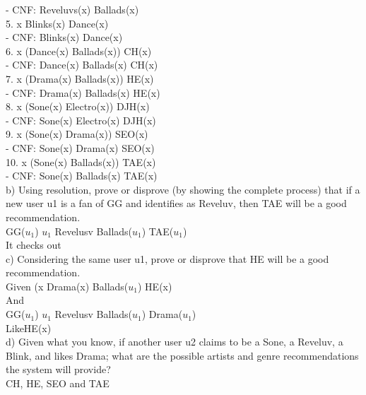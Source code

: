 \documentclass{article}
\begin{document}
\: \: \: \: - CNF: \neg Reveluvs(x) \wedge Ballads(x)\\

5. \forall x \: Blinks(x) \Rightarrow Dance(x)\\

\: \: \: \: - CNF: \neg Blinks(x) \vee Dance(x)\\

6. \forall x \: (Dance(x) \wedge Ballads(x)) \Rightarrow CH(x)\\

\: \: \: \: - CNF: \neg Dance(x) \vee \neg Ballads(x) \vee CH(x)\\

7. \forall x \: (Drama(x) \wedge Ballads(x)) \Rightarrow HE(x)\\

\: \: \: \: - CNF: \neg Drama(x) \vee \neg Ballads(x) \vee HE(x)\\

8. \forall x \: (Sone(x) \wedge Electro(x)) \Rightarrow DJH(x)\\

\: \: \: \: - CNF: \neg Sone(x) \vee \neg Electro(x) \vee DJH(x)\\

9. \forall x \: (Sone(x) \wedge Drama(x)) \Rightarrow SEO(x)\\

\: \: \: \: - CNF: \neg Sone(x) \vee \neg Drama(x) \vee SEO(x)\\

10. \forall x \: (Sone(x) \wedge Ballads(x)) \Rightarrow TAE(x)\\

\: \: \: \: - CNF: \neg Sone(x) \vee \neg Ballads(x) \vee TAE(x)\\

b) Using resolution, prove or disprove (by showing the complete process) that if a new user u1 is a fan of GG and identifies as Reveluv, then TAE will be a good recommendation.\\

GG($u_1$) \Leftrightarrow $u_1$ \in Revelusv \Rightarrow Ballads($u_1$) \Rightarrow TAE($u_1$)\\

It checks out\\

c) Considering the same user u1, prove or disprove that HE will be a good recommendation.\\

Given (x \in Drama(x) \wedge Ballads($u_1$) \Rightarrow HE(x)\\
And\\
GG($u_1$) \Leftrightarrow $u_1$ \in Revelusv \Rightarrow Ballads($u_1$) \wedge \neg Drama($u_1$)\\


\neg LikeHE(x)\\

d) Given what you know, if another user u2 claims to be a Sone, a Reveluv, a Blink, and likes Drama;
what are the possible artists and genre recommendations the system will provide? \\

CH, HE, SEO and TAE
\end{document}
